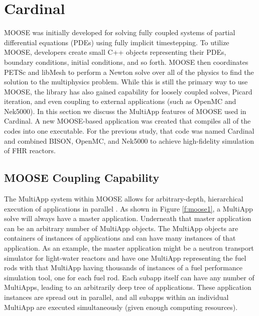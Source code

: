 \section{Cardinal}
\label{s:cardinal}

MOOSE was initially developed for solving fully coupled systems of partial
differential equations (PDEs) using fully implicit timestepping. To utilize
MOOSE, developers create small C++ objects representing their PDEs, boundary
conditions, initial conditions, and so forth. MOOSE then coordinates PETSc and
libMesh \cite{kirk2006libmesh} to perform a Newton solve over all of the
physics to find the solution to the multiphysics problem. While this is still
the primary way to use MOOSE, the library has also gained capability for
loosely coupled solves, Picard iteration, and even coupling to external
applications (such as OpenMC and Nek5000).  In this section we discuss the
MultiApp features of MOOSE used in Cardinal.  A new MOOSE-based application was
created \cite{cardinal}  that compiles all of the codes into one executable.
For the previous study, that code was named Cardinal and combined BISON,
OpenMC, and Nek5000 to achieve high-fidelity simulation of FHR reactors.

\subsection{MOOSE Coupling Capability}

The MultiApp system within MOOSE allows for arbitrary-depth, hierarchical execution of applications in parallel \cite{gaston2015physics}. As shown in Figure \ref{f:moose1}, a MultiApp solve will always have a master application. Underneath that master application can be an arbitrary number of MultiApp objects. The MultiApp objects are containers of instances of applications and can have many instances of that application. As an example, the master application might be a neutron transport simulator for light-water reactors and have one MultiApp representing the fuel rods with that MultiApp having thousands of instances of a fuel performance simulation tool, one for each fuel rod. Each subapp itself can have any number of MultiApps, leading to an arbitrarily deep tree of applications. These application instances are spread out in parallel, and all subapps within an individual MultiApp are executed simultaneously (given enough computing resources).

